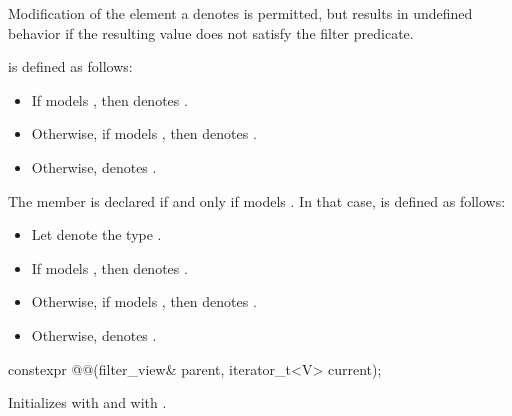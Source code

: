 \pnum
Modification of the element a  denotes is
permitted, but results in undefined behavior if the resulting value does not
satisfy the filter predicate.

\pnum
{} is defined as follows:
\begin{itemize}
\item If  models , then
 denotes .

\item Otherwise, if  models , then
 denotes .

\item Otherwise,  denotes .
\end{itemize}

\pnum
The member   is declared
if and only if  models .
In that case,
 is defined as follows:
\begin{itemize}
\item Let  denote the type
.

\item If  models
,
then  denotes .

\item Otherwise, if   models
,
then  denotes .

\item Otherwise,  denotes .
\end{itemize}

%
\begin{itemdecl}
constexpr @@(filter_view& parent, iterator_t<V> current);
\end{itemdecl}

\begin{itemdescr}
\pnum
\effects
Initializes  with  and
 with .
\end{itemdescr}

